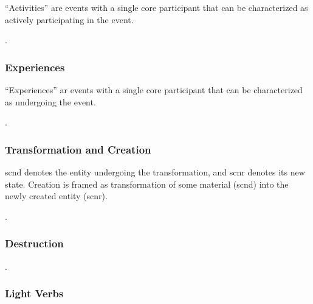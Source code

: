 \documentclass[a4paper]{article}
\begin{document}
``Activities'' are events with a single core participant that can be
characterized as actively participating in the event.

\ex. 

\subsubsection{Experiences}

``Experiences'' ar events with a single core participant that can be
characterized as undergoing the event.

\ex. 

\subsubsection{Transformation and Creation}

\textsf{scnd} denotes the entity undergoing the transformation, and
\textsf{scnr} denotes its new state. Creation is framed as transformation of
some material (\textsf{scnd}) into the newly created entity (\textsf{scnr}).

\ex. 

\subsubsection{Destruction}

\ex. 

%
%

\subsubsection{Light Verbs}
\end{document}
